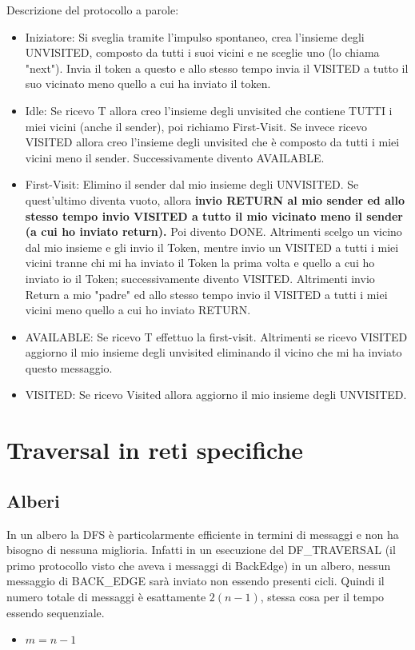 Descrizione del protocollo a parole:
\begin{itemize}
    \item Iniziatore: Si sveglia tramite l'impulso spontaneo, crea l'insieme degli
          UNVISITED, composto da tutti i suoi vicini e ne sceglie uno (lo chiama
          "next"). Invia il token a questo e allo stesso tempo invia il  VISITED a tutto
          il suo vicinato meno quello a cui ha inviato il token.
    \item Idle: Se ricevo T allora creo l'insieme degli unvisited che contiene
          TUTTI i miei vicini (anche il sender), poi richiamo First-Visit. Se
          invece ricevo VISITED allora creo l'insieme degli unvisited che è
          composto da tutti i miei vicini meno il sender. Successivamente divento
          AVAILABLE.
    \item First-Visit: Elimino il sender dal mio insieme degli UNVISITED. Se
          quest'ultimo diventa vuoto, allora \textbf{invio RETURN al mio sender ed allo
              stesso tempo invio VISITED a tutto il mio vicinato meno il sender (a cui ho
              inviato return).} Poi divento DONE. Altrimenti scelgo un vicino dal mio
          insieme e gli invio il Token, mentre invio un VISITED a tutti i miei vicini
          tranne chi mi ha inviato il Token la prima volta e quello a cui ho inviato io
          il Token; successivamente divento VISITED. Altrimenti invio Return a mio
          "padre" ed allo stesso tempo invio il VISITED a tutti i miei vicini meno
          quello a cui ho inviato RETURN.
    \item AVAILABLE: Se ricevo T effettuo la first-visit. Altrimenti se ricevo
          VISITED aggiorno il mio insieme degli unvisited eliminando il vicino che mi ha
          inviato questo messaggio.
    \item VISITED: Se ricevo Visited allora aggiorno il mio insieme degli
          UNVISITED.
\end{itemize}


\section{Traversal in reti specifiche}
\subsection{Alberi}
In un albero la DFS è particolarmente efficiente in termini di messaggi e non ha
bisogno di nessuna miglioria. Infatti in un esecuzione del DF\_TRAVERSAL (il
primo protocollo visto che aveva i messaggi di BackEdge) in un albero, nessun
messaggio di BACK\_EDGE sarà inviato non essendo presenti cicli. Quindi il numero
totale di messaggi è esattamente $2(n-1)$, stessa cosa per il tempo essendo
sequenziale.
\begin{itemize}
    \item $m = n -1$
\end{itemize}

